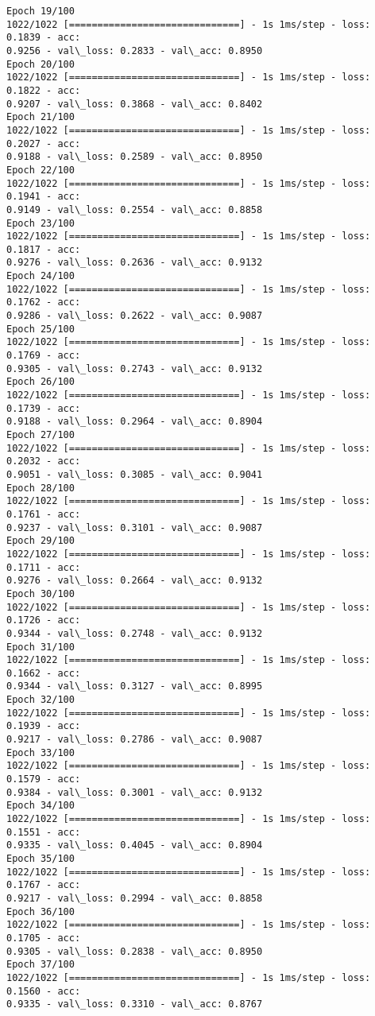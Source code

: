 \documentclass[11pt]{article}
\begin{document}
\begin{Verbatim}[commandchars=\\\{\}]
Epoch 19/100
1022/1022 [==============================] - 1s 1ms/step - loss: 0.1839 - acc:
0.9256 - val\_loss: 0.2833 - val\_acc: 0.8950
Epoch 20/100
1022/1022 [==============================] - 1s 1ms/step - loss: 0.1822 - acc:
0.9207 - val\_loss: 0.3868 - val\_acc: 0.8402
Epoch 21/100
1022/1022 [==============================] - 1s 1ms/step - loss: 0.2027 - acc:
0.9188 - val\_loss: 0.2589 - val\_acc: 0.8950
Epoch 22/100
1022/1022 [==============================] - 1s 1ms/step - loss: 0.1941 - acc:
0.9149 - val\_loss: 0.2554 - val\_acc: 0.8858
Epoch 23/100
1022/1022 [==============================] - 1s 1ms/step - loss: 0.1817 - acc:
0.9276 - val\_loss: 0.2636 - val\_acc: 0.9132
Epoch 24/100
1022/1022 [==============================] - 1s 1ms/step - loss: 0.1762 - acc:
0.9286 - val\_loss: 0.2622 - val\_acc: 0.9087
Epoch 25/100
1022/1022 [==============================] - 1s 1ms/step - loss: 0.1769 - acc:
0.9305 - val\_loss: 0.2743 - val\_acc: 0.9132
Epoch 26/100
1022/1022 [==============================] - 1s 1ms/step - loss: 0.1739 - acc:
0.9188 - val\_loss: 0.2964 - val\_acc: 0.8904
Epoch 27/100
1022/1022 [==============================] - 1s 1ms/step - loss: 0.2032 - acc:
0.9051 - val\_loss: 0.3085 - val\_acc: 0.9041
Epoch 28/100
1022/1022 [==============================] - 1s 1ms/step - loss: 0.1761 - acc:
0.9237 - val\_loss: 0.3101 - val\_acc: 0.9087
Epoch 29/100
1022/1022 [==============================] - 1s 1ms/step - loss: 0.1711 - acc:
0.9276 - val\_loss: 0.2664 - val\_acc: 0.9132
Epoch 30/100
1022/1022 [==============================] - 1s 1ms/step - loss: 0.1726 - acc:
0.9344 - val\_loss: 0.2748 - val\_acc: 0.9132
Epoch 31/100
1022/1022 [==============================] - 1s 1ms/step - loss: 0.1662 - acc:
0.9344 - val\_loss: 0.3127 - val\_acc: 0.8995
Epoch 32/100
1022/1022 [==============================] - 1s 1ms/step - loss: 0.1939 - acc:
0.9217 - val\_loss: 0.2786 - val\_acc: 0.9087
Epoch 33/100
1022/1022 [==============================] - 1s 1ms/step - loss: 0.1579 - acc:
0.9384 - val\_loss: 0.3001 - val\_acc: 0.9132
Epoch 34/100
1022/1022 [==============================] - 1s 1ms/step - loss: 0.1551 - acc:
0.9335 - val\_loss: 0.4045 - val\_acc: 0.8904
Epoch 35/100
1022/1022 [==============================] - 1s 1ms/step - loss: 0.1767 - acc:
0.9217 - val\_loss: 0.2994 - val\_acc: 0.8858
Epoch 36/100
1022/1022 [==============================] - 1s 1ms/step - loss: 0.1705 - acc:
0.9305 - val\_loss: 0.2838 - val\_acc: 0.8950
Epoch 37/100
1022/1022 [==============================] - 1s 1ms/step - loss: 0.1560 - acc:
0.9335 - val\_loss: 0.3310 - val\_acc: 0.8767

\end{Verbatim}
\end{document}
